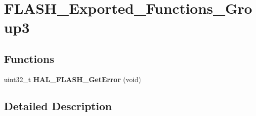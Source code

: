 \hypertarget{group___f_l_a_s_h___exported___functions___group3}{}\section{F\+L\+A\+S\+H\+\_\+\+Exported\+\_\+\+Functions\+\_\+\+Group3}
\label{group___f_l_a_s_h___exported___functions___group3}
\subsection*{Functions}
\begin{DoxyCompactItemize}
\item 
\mbox{\label{group___f_l_a_s_h___exported___functions___group3_ga20e71ba6b2a09cd5b9f0bd369f842de3}} 
uint32\+\_\+t {\bfseries H\+A\+L\+\_\+\+F\+L\+A\+S\+H\+\_\+\+Get\+Error} (void)
\end{DoxyCompactItemize}


\subsection{Detailed Description}

